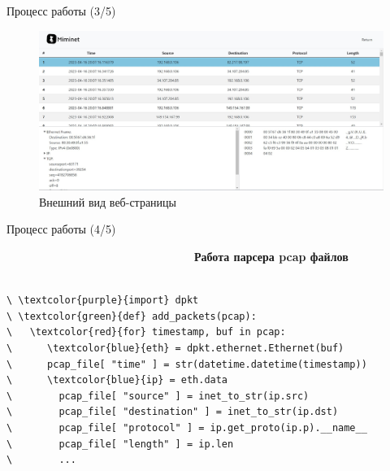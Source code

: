 \documentclass[aspectratio=169]{beamer}
\begin{document}
\begin{frame}[fragile]{Процесс работы (3/5)}
	\begin{figure}[h]

		\centering
			
		\includegraphics[width=0.8\linewidth]{cite.jpg}
			
		\caption{Внешний вид веб-страницы}
			
		\label{fig:mpr}
			
	\end{figure}
\end{frame}

\begin{frame}[fragile]{Процесс работы (4/5)}
	\begin{minipage}{5in}
		~~~~~~~~~~~~~~~~~~~~~~~~~~~~~~~~~\textbf{Работа парсера pcap файлов}
\begin{Verbatim}[commandchars=\\\{\}]

\ \textcolor{purple}{import} dpkt
\ \textcolor{green}{def} add_packets(pcap):
\   \textcolor{red}{for} timestamp, buf in pcap:
\      \textcolor{blue}{eth} = dpkt.ethernet.Ethernet(buf)
\      pcap_file[ "time" ] = str(datetime.datetime(timestamp))
\      \textcolor{blue}{ip} = eth.data
\	     pcap_file[ "source" ] = inet_to_str(ip.src)
\	     pcap_file[ "destination" ] = inet_to_str(ip.dst)
\	     pcap_file[ "protocol" ] = ip.get_proto(ip.p).__name__
\	     pcap_file[ "length" ] = ip.len
\	     ... 
	 \end{Verbatim}
	\end{minipage}
\end{frame}
\end{document}
